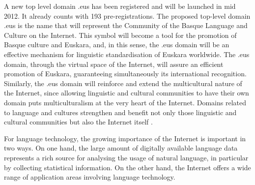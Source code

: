 \begin{multicols}{2}
A new top level domain .eus has been registered and will be launched in mid 2012. It already counts with 193 pre-registrations. The proposed top-level domain .eus is the name that will represent the Community of the Basque Language and Culture on the Internet. This symbol will become a tool for the promotion of Basque culture and Euskara, and, in this sense, the .eus domain will be an effective mechanism for linguistic standardisation of Euskara worldwide. The .eus domain, through the virtual space of the Internet, will assure an efficient promotion of Euskara, guaranteeing simultaneously its international recognition. Similarly, the .eus domain will reinforce and extend the multicultural nature of the Internet, since allowing linguistic and cultural communities to have their own domain puts multiculturalism at the very heart of the Internet. Domains related to language and cultures strengthen and benefit not only those linguistic and cultural communities but also the Internet itself  \cite{BAS-Nota23}. 

For language technology, the growing importance of the Internet is important in two ways. On one hand, the large amount of digitally available language data represents a rich source for analysing the usage of natural language, in particular by collecting statistical information. On the other hand, the Internet offers a wide range of application areas involving language technology. 

\end{multicols}

\clearpage



